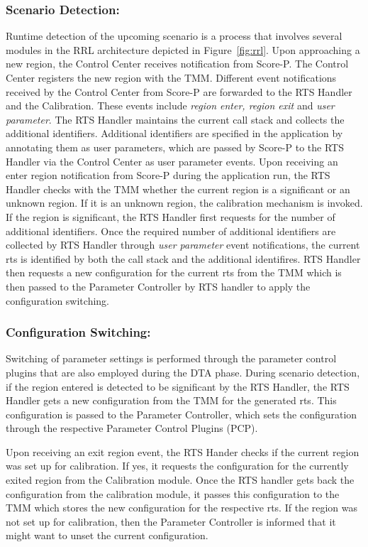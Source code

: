 \subsubsection{Scenario Detection:} Runtime detection of the upcoming scenario is a process that involves several modules in
the RRL architecture depicted in Figure~\ref{fig:rrl}. Upon approaching a new region, the Control Center receives notification from Score-P. The Control Center registers the new region with the TMM. Different event notifications received by the Control Center from Score-P are forwarded to the RTS Handler and the Calibration. These events include \textit{region enter, region exit} and \textit{user parameter}. The RTS Handler maintains the current call stack and collects the additional identifiers. Additional identifiers are specified in the application by annotating them as user parameters, which are passed by Score-P to the RTS Handler via the Control Center as user parameter events. Upon receiving an enter region notification from Score-P during the application run, the RTS Handler checks with the TMM whether the current region is a significant or an unknown region. 
If it is an unknown region, the calibration mechanism is invoked.
If the region is significant, the RTS Handler first requests for the number of additional identifiers. Once the required number of additional identifiers are collected by RTS Handler through \textit{user parameter} event notifications, the current rts is identified by both the call stack and the additional identifires.
RTS Handler then requests a new configuration for the current rts from the TMM which is then passed to the Parameter Controller by RTS handler to apply the configuration switching. 
\subsubsection{Configuration Switching:} Switching of parameter settings is performed through the parameter control plugins that are also employed during the DTA phase.
During scenario detection, if the region entered is detected to be significant by the RTS Handler, the RTS Handler gets a new configuration from the TMM for the generated rts. 
This configuration is passed to the Parameter Controller, which sets the configuration through the respective Parameter Control Plugins (PCP).

Upon receiving an exit region event, the RTS Hander checks if the current region was set up for calibration. If yes, it requests the configuration for the currently exited region from the
Calibration module. Once the RTS handler gets back the configuration from the calibration module, it passes this configuration to the TMM which stores the new configuration for the respective rts. If the region was not set up for calibration, then the Parameter Controller is informed that it might want to unset the current configuration. 

